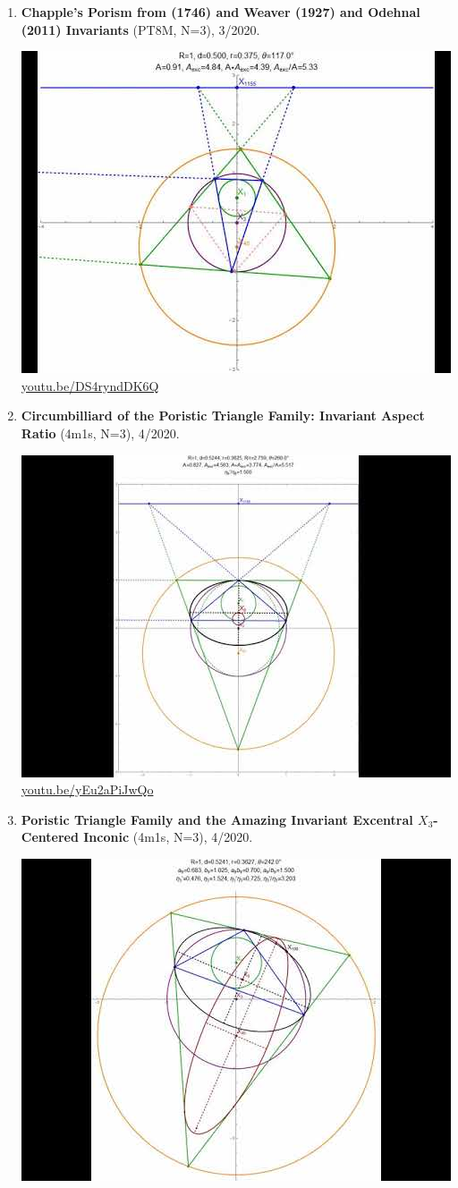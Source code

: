 \documentclass[12pt]{amsart}
\begin{document}
\begin{enumerate}[resume]
\item \textbf{Chapple's Porism from (1746) and Weaver (1927) and Odehnal (2011) Invariants} (PT8M, N=3), 3/2020. 
\begin{center}\includegraphics[width=.5\textwidth]{pics/DS4ryndDK6Q.jpg} \\ 
\href{https://youtu.be/DS4ryndDK6Q}{\url{youtu.be/DS4ryndDK6Q}}\end{center}
% 
\item \textbf{Circumbilliard of the Poristic Triangle Family: Invariant Aspect Ratio} (4m1s, N=3), 4/2020. 
\begin{center}\includegraphics[width=.5\textwidth]{pics/yEu2aPiJwQo.jpg} \\ 
\href{https://youtu.be/yEu2aPiJwQo}{\url{youtu.be/yEu2aPiJwQo}}\end{center}
% 
\item \textbf{Poristic Triangle Family and the Amazing Invariant Excentral $X_{3}$-Centered Inconic} (4m1s, N=3), 4/2020. 
\begin{center}\includegraphics[width=.5\textwidth]{pics/0VHBjdHXbJc.jpg} \\ 

\end{center}
\end{enumerate}
\end{document}
